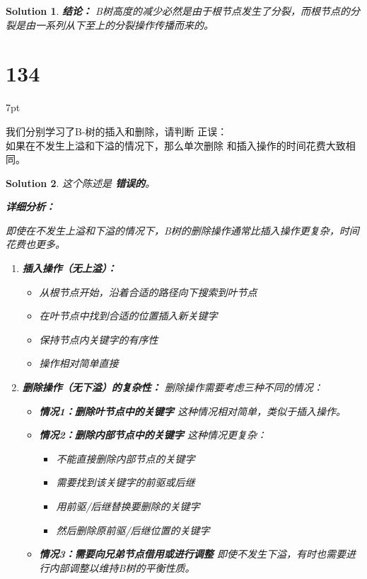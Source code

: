\documentclass[UTF8]{report}
\newtheorem{solution}{Solution}
\theoremstyle{MyLineTheoremStyle} %
\theoremstyle{MyBlockTheoremStyle} %
\theoremstyle{MySubsubsectionStyle} %
\newenvironment{graybox}{%
        \def\FrameCommand{%
        \hspace{1pt}%
        {\color{gray}\small \vrule width 2pt}%
        {\color{graybox_color}\vrule width 4pt}%
        \colorbox{graybox_color}%
        }%
        \MakeFramed{\advance\hsize-\width\FrameRestore}%
        \noindent\hspace{-4.55pt}%
        \begin{adjustwidth}{}{7pt}%
        \vspace{2pt}\vspace{2pt}%
        }
        {%
        \vspace{2pt}\end{adjustwidth}\endMakeFramed%
        }
\begin{document}
\begin{solution}
\textbf{结论：}
B树高度的减少必然是由于根节点发生了分裂，而根节点的分裂是由一系列从下至上的分裂操作传播而来的。
\end{solution}


\section*{134}
\begin{graybox}
我们分别学习了B-树的插入和删除，请判断
正误：\\
如果在不发生上溢和下溢的情况下，那么单次删除
和插入操作的时间花费大致相同。
\end{graybox}

\begin{solution}
这个陈述是 \textbf{错误的}。

\textbf{详细分析：}

即使在不发生上溢和下溢的情况下，B树的删除操作通常比插入操作更复杂，时间花费也更多。

\begin{enumerate}
    \item \textbf{插入操作（无上溢）：}
    \begin{itemize}
        \item 从根节点开始，沿着合适的路径向下搜索到叶节点
        \item 在叶节点中找到合适的位置插入新关键字
        \item 保持节点内关键字的有序性
        \item 操作相对简单直接
    \end{itemize}

    \item \textbf{删除操作（无下溢）的复杂性：}
    删除操作需要考虑三种不同的情况：
    \begin{itemize}
        \item \textbf{情况1：删除叶节点中的关键字}
            这种情况相对简单，类似于插入操作。
        \item \textbf{情况2：删除内部节点中的关键字}
            这种情况更复杂：
            \begin{itemize}
                \item 不能直接删除内部节点的关键字
                \item 需要找到该关键字的前驱或后继
                \item 用前驱/后继替换要删除的关键字
                \item 然后删除原前驱/后继位置的关键字
            \end{itemize}
        \item \textbf{情况3：需要向兄弟节点借用或进行调整}
            即使不发生下溢，有时也需要进行内部调整以维持B树的平衡性质。
    \end{itemize}


\end{enumerate}
\end{solution}
\end{document}
